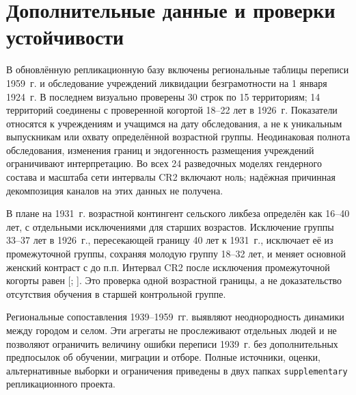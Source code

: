 \clearpage
\section*{Дополнительные данные и проверки устойчивости}

В обновлённую репликационную базу включены региональные таблицы переписи
1959~г. и обследование учреждений ликвидации безграмотности на 1 января
1924~г. В последнем визуально проверены 30 строк по 15 территориям;
14 территорий соединены с проверенной когортой 18--22 лет в 1926~г.
Показатели относятся к учреждениям и учащимся на дату обследования,
а не к уникальным выпускникам или охвату определённой возрастной группы.
Неодинаковая полнота обследования, изменения границ и эндогенность
размещения учреждений ограничивают интерпретацию. Во всех 24 разведочных
моделях гендерного состава и масштаба сети интервалы CR2 включают ноль;
надёжная причинная декомпозиция каналов на этих данных не получена.

В плане на 1931~г. возрастной контингент сельского ликбеза определён
как 16--40 лет, с отдельными исключениями для старших возрастов.
Исключение группы 33--37 лет в 1926~г., пересекающей границу 40 лет
к 1931~г., исключает её из промежуточной группы, сохраняя молодую группу 18--32 лет, и меняет основной женский контраст с
 до  п.п.
Интервал CR2 после исключения промежуточной когорты равен
[; ].
Это проверка одной возрастной границы, а не доказательство отсутствия
обучения в старшей контрольной группе.

Региональные сопоставления 1939--1959~гг. выявляют неоднородность
динамики между городом и селом. Эти агрегаты не прослеживают отдельных
людей и не позволяют ограничить величину ошибки переписи 1939~г. без
дополнительных предпосылок об обучении, миграции и отборе. Полные источники,
оценки, альтернативные выборки и ограничения приведены в двух папках
\foreignlanguage{english}{\texttt{supplementary}} репликационного проекта.
